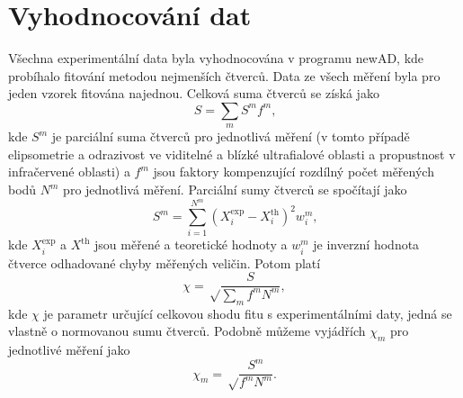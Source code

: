 \section{Vyhodnocování dat}
Všechna experimentální data byla vyhodnocována v programu newAD, kde probíhalo fitování metodou nejmenších čtverců. Data ze všech měření byla pro jeden vzorek fitována najednou. Celková suma čtverců se získá jako
%
\begin{equation} S = \sum_m S^m f^m \text{,}\end{equation}
%
kde $S^m$ je parciální suma čtverců pro jednotlivá měření (v tomto případě elipsometrie a odrazivost ve viditelné a blízké ultrafialové oblasti a propustnost v infračervené oblasti) a $f^m$ jsou faktory kompenzující rozdílný počet měřených bodů $N^m$ pro jednotlivá měření. Parciální sumy čtverců se spočítají jako
%
\begin{equation} S^m = \sum_{i=1}^{N^m} (X_i^\mathrm{exp} - X_i^\mathrm{th})^2 w_i^m \text{,} \end{equation}
%
kde $X_i^\mathrm{exp}$ a $X^\mathrm{th}$ jsou měřené a teoretické hodnoty a $w_i^m$ je inverzní hodnota čtverce odhadované chyby měřených veličin. Potom platí \cite{Franta2011}
%
\begin{equation} \chi = \sqrt \frac{S}{\sum_m f^m N^m} \mathrm{,}\end{equation}
kde $\chi$ je parametr určující celkovou shodu fitu s experimentálními daty, jedná se vlastně o normovanou sumu čtverců. Podobně můžeme vyjádřích $\chi_m$ pro jednotlivé měření jako
%
\begin{equation} \chi_m = \sqrt \frac{S^m}{f^m N^m} \mathrm{.}\end{equation}

\cleardoublepage
